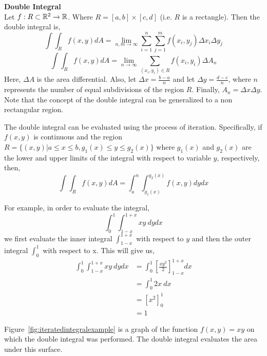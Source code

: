 \documentclass[12pt]{article}
\begin{document}
\begin{framed}
\textbf{Double Integral} \\
Let $f:R\subset\mathbb{R}^2\rightarrow\mathbb{R}$. Where $R=[a,b]\times[c,d]$ (i.e. $R$ is a rectangle). Then the double integral is,
\[
\int\int_R f(x,y)dA = \lim_{n,m\rightarrow\infty}\sum_{i=1}^n\sum_{j=1}^m f(x_i,y_j)\Delta x_i \Delta y_j
\] 
\[
\int\int_R f(x,y)dA = \lim_{n \rightarrow \infty} \sum_{(x_i,y_i)\in R} f(x_i,y_i) \Delta A_n
\]
 Here, $\Delta A$ is the area differential. Also, let $\Delta x = \frac{b-a}{n}$ and let $\Delta y = \frac{d-c}{n}$, where $n$ represents the number of equal subdivisions of the region $R$. Finally, $A_n = \Delta x \Delta y$. Note that the concept of the double integral can be generalized to a non rectangular region. 
 \end{framed}

The double integral can be evaluated using the process of iteration. Specifically, if $f(x,y)$ is continuous and the region $R=\{(x,y)|a\leq x\leq b, g_1(x) \leq y \leq g_2(x)\}$ where $g_1(x)$ and $g_2(x)$ are the lower and upper limits of the integral with respect to variable $y$, respectively, then,
\[
\int\int_R f(x,y)dA = \int_a^n\int_{g_1(x)}^{g_2(x)} f(x,y) dydx
\]

 For example, in order to evaluate the integral,
\[
\int_0^1\int_{1-x}^{1+x} xy\ dydx
\]
we first evaluate the inner integral $\int_{1-x}^{1+x}$ with respect to $y$ and then the outer integral $\int_0^1$ with respect to x. This will give us,
\begin{align*}
\int_0^1\int_{1-x}^{1+x} xy\ dydx &= \int_0^1\left[ \frac{xy^2}{2} \right]_{1-x}^{1+x} dx \\
&= \int_0^1 2x\ dx \\
&= \left[ x^2 \right]_0^1 \\
&= 1
\end{align*} 

Figure~\ref{fig:iteratedintegralexample} is a graph of the function $f(x,y) = xy$ on which the double integral was performed. The double integral evaluates the area under this surface. 
\end{document}
